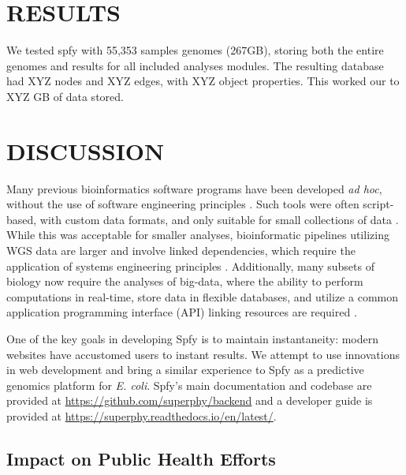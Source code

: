 \documentclass[a4,center,fleqn]{NAR}
\begin{document}
\section{RESULTS}

We tested spfy with 55,353 samples genomes (267GB), storing both the entire genomes and results for all included analyses modules.
The resulting database had XYZ nodes and XYZ edges, with XYZ object properties.
This worked our to XYZ GB of data stored.



\section{DISCUSSION}

Many previous bioinformatics software programs have been developed \textit{ad hoc}, without the use of software engineering principles \cite{de2015trends}.
Such tools were often script-based, with custom data formats, and only suitable for small collections of data \cite{de2015trends}.
While this was acceptable for smaller analyses, bioinformatic pipelines utilizing WGS data are larger and involve linked dependencies, which require the application of systems engineering principles \cite{schatz2015biological}.
Additionally, many subsets of biology now require the analyses of big-data, where the ability to perform computations in real-time, store data in flexible databases, and utilize a common application programming interface (API) linking resources are required \cite{swaminathan2016review}.

One of the key goals in developing Spfy is to maintain instantaneity: modern websites have accustomed users to instant results.
We attempt to use innovations in web development and bring a similar experience to Spfy as a predictive genomics platform for \textit{E. coli}.
Spfy's main documentation and codebase are provided at \url{https://github.com/superphy/backend} and a developer guide is provided at \url{https://superphy.readthedocs.io/en/latest/}.

\subsection{Impact on Public Health Efforts}
\end{document}
